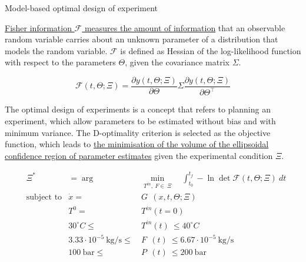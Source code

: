 \documentclass[a0,portrait]{a0poster}
\begin{document}
\begin{multicols}{2}
\begin{tcolorbox}[width=\linewidth, boxrule=0mm, sharp corners=all, colback=white]
\end{tcolorbox}

\begin{tcolorbox}[width=\linewidth, boxrule=0mm, sharp corners=all, colback=white]
\begin{tcolorbox}[width=\linewidth, boxrule=0mm, sharp corners=all, colback=white]
	{\LARGE Model-based optimal design of experiment\\}
\end{tcolorbox}

\underline{Fisher information $\mathcal{F}$ measures the amount of information} that an observable random variable carries about an unknown parameter of a distribution that models the random variable. $\mathcal{F}$ is defined as Hessian of the log-likelihood function with respect to the parameters $\Theta$, given the covariance matrix $\Sigma$. %

\begin{equation*}
	\mathcal{F}(t,\Theta; \Xi) = \frac{\partial y(t, \Theta; \Xi)}{\partial \Theta} \Sigma \frac{\partial y(t, \Theta; \Xi)}{\partial \Theta^\top}
\end{equation*}

The optimal design of experiments is a concept that refers to planning an experiment, which allow parameters to be estimated without bias and with minimum variance. The D-optimality criterion is selected as the objective function, which leads to \underline{the minimisation of the volume of the ellipsoidal confidence region of parameter estimates} given the experimental condition $\Xi$. 

\begin{equation*}
	\begin{aligned} 
		&\Xi^* &= \arg &\min_{ T^{in},~F\in~\Xi}\quad\int_{t_0}^{t_f} - \ln \det \mathcal{F}(t,\Theta; \Xi)~dt  \\
		&\text{subject to}
		& \dot{x} = ~&G~~(x,t,\Theta;\Xi) \\
		&& T^{0} = ~&T^{in}(t=0) \\
		&& 30^\circ C \leq ~&T^{in}(t) ~ \leq 40^\circ C \\
		&& 3.33 \cdot 10^{-5}~\text{kg/s} \leq ~&F~~(t)~ \leq 6.67 \cdot 10^{-5}~\text{kg/s}\\
		&& 100~\text{bar} \leq ~&P~~(t)~ \leq 200~\text{bar} \\
	\end{aligned}
\end{equation*}


\end{tcolorbox}
\end{multicols}
\end{document}
